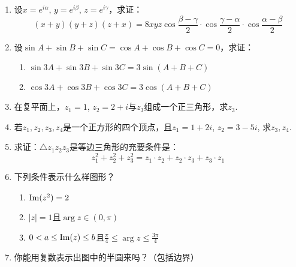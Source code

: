 \begin{enumerate}
\item 设$x=e^{i\alpha}$, $y=e^{i\beta}$, $z=e^{i\gamma}$，求证：
\[(x+y)(y+z)(z+x)=8xyz\cos\frac{\beta-\gamma}{2}\cdot \cos\frac{\gamma-\alpha}{2}\cdot \cos\frac{\alpha-\beta}{2}\]

\item 设$\sin A+\sin B+\sin C=\cos A+\cos B+\cos C=0$，求证：
\begin{enumerate}[(1)]
    \item $\sin3A+\sin3B+\sin3C=3\sin(A+B+C)$
\item $\cos3A+\cos3B+\cos3C=3\cos(A+B+C)$
\end{enumerate}
\item 在复平面上，$z_1=1$, $z_2=2+i$与$z_3$组成一个正三角形，求$z_3$.
\item 若$z_1,z_2,z_3,z_4$是一个正方形的四个顶点，且$z_1=1+2i$, $z_2=3-5i$, 求$z_3,z_4$.
\item 求证：$\triangle z_1z_2z_3$是等边三角形的充要条件是：
\[z_1^2+z_2^2+z_3^2=z_1\cdot z_2+z_2\cdot z_3+z_3\cdot z_1\]
\item 下列条件表示什么样图形？
\begin{enumerate}[(1)]
    \item ${\rm Im}(z^2)=2$
    \item $|z|=1$且$\arg z\in(0,\pi)$
    \item $0<a\le {\rm Im}(z)\le b$且$\frac{\pi}{4}\le \arg z\le \frac{3\pi}{4}$
\end{enumerate}
\item 你能用复数表示出图中的半圆来吗？（包括边界）

\begin{minipage}{.45\textwidth}
    \centering
{}
\end{minipage}\hfill
\begin{minipage}{.45\textwidth}
    \centering
{}
\end{minipage} 


\end{enumerate}
